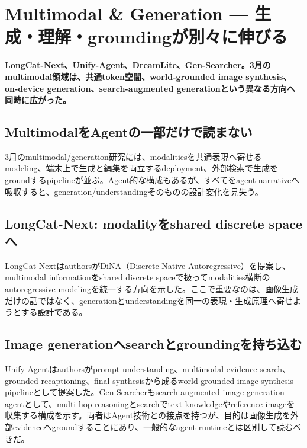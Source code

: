 \section{Multimodal \& Generation — 生成・理解・groundingが別々に伸びる}
\noindent\textbf{LongCat-Next、Unify-Agent、DreamLite、Gen-Searcher。3月のmultimodal領域は、共通token空間、world-grounded image synthesis、on-device generation、search-augmented generationという異なる方向へ同時に広がった。}\autocite{src-197775677c0d,src-abece2adf5a7,src-ac36472a8f09,src-b8369fd2c988}

\subsection{MultimodalをAgentの一部だけで読まない}

3月のmultimodal/generation研究には、modalitiesを共通表現へ寄せるmodeling、端末上で生成と編集を両立するdeployment、外部検索で生成をgroundするpipelineが並ぶ。Agent的な構成もあるが、すべてをagent narrativeへ吸収すると、generation/understandingそのものの設計変化を見失う。\autocite{src-197775677c0d,src-abece2adf5a7,src-ac36472a8f09,src-b8369fd2c988}


\subsection{LongCat-Next: modalityをshared discrete spaceへ}

LongCat-NextはauthorsがDiNA（Discrete Native Autoregressive）を提案し、multimodal informationをshared discrete spaceで扱ってmodalities横断のautoregressive modelingを統一する方向を示した。ここで重要なのは、画像生成だけの話ではなく、generationとunderstandingを同一の表現・生成原理へ寄せようとする設計である。\autocite{src-ac36472a8f09}


\subsection{Image generationへsearchとgroundingを持ち込む}

Unify-Agentはauthorsがprompt understanding、multimodal evidence search、grounded recaptioning、final synthesisから成るworld-grounded image synthesis pipelineとして提案した。Gen-Searcherもsearch-augmented image generation agentとして、multi-hop reasoningとsearchでtext knowledgeやreference imageを収集する構成を示す。両者はAgent技術との接点を持つが、目的は画像生成を外部evidenceへgroundすることにあり、一般的なagent runtimeとは区別して読むべきだ。\autocite{src-197775677c0d,src-abece2adf5a7}


